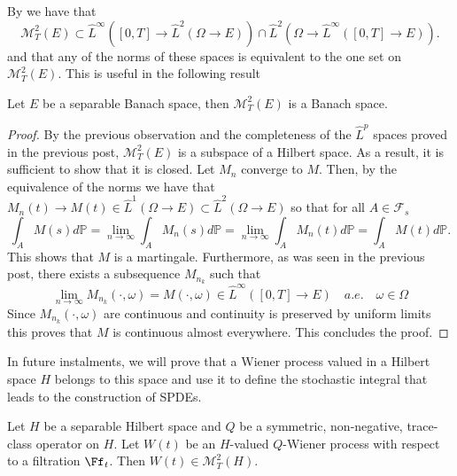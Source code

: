 \documentclass[
    a4paper,
    DIV=14,
    abstract=true,
    numbers=noenddot
]{scrartcl}
\begin{document}
By  we have that
\begin{equation*}
	\mathcal{M}_T^2(E)\subset \hat{L}^\infty([0,T]\to \hat{L}^2(\Omega\to E))\cap \hat{L}^2(\Omega\to \hat{L}^\infty([0,T]\to E)).
\end{equation*}
and that any of the norms of these spaces is equivalent to the one set on $\mathcal{M}_T^2(E)$. This is useful in the following result
\begin{proposition}
	Let $E$ be a separable Banach space, then $\mathcal{M}_T^2(E)$ is a Banach space.
\end{proposition}
\begin{proof}
	By the previous observation  and the completeness of the $\hat{L}^p$ spaces proved in the previous post, $\mathcal{M}_T^2(E)$ is a subspace of a Hilbert space. As a result, it is sufficient to show that it is closed. Let $M_n$ converge to $M$. Then, by the equivalence of the norms we have that $M_n(t)\to M(t)\in \hat{L}^1(\Omega\to E)\subset \hat{L}^2(\Omega\to E)$ so that for all $A\in\mathcal{F}_s$
	\begin{equation*}
		\int_A M(s)d\mathbb{P}=\lim_{n\to\infty}\int_A M_n(s)d\mathbb{P}=\lim_{n\to\infty}\int_A M_n(t)d\mathbb{P}=\int_A M(t)d\mathbb{P}.
	\end{equation*}
	This shows that $M$ is a martingale. Furthermore, as was seen in the previous post, there exists a subsequence $M_{n_k}$ such that
	\begin{equation*}
		\lim_{n\to\infty}{M_{n_k}}(\cdot,\omega)=M(\cdot,\omega)\in \hat{L}^\infty([0,T]\to E)\quad a.e.\quad \omega\in\Omega
	\end{equation*}
	Since $M_{n_k}(\cdot,\omega)$ are continuous and continuity is preserved by uniform limits this proves that $M$ is continuous almost everywhere. This concludes the proof.
\end{proof}
In future instalments, we will prove that a Wiener process valued in a Hilbert space $H$ belongs to this space and use it to define the stochastic integral that leads to the construction of SPDEs.
\begin{proposition}
    Let $H$ be a separable Hilbert space and $Q$ be a symmetric, non-negative, trace-class operator on $H$. Let $W(t)$ be an $H$-valued $Q$-Wiener process with respect to a filtration $\Ff_t$. Then $W(t) \in \mathcal{M}_T^2(H)$.
\end{proposition}
\end{document}
